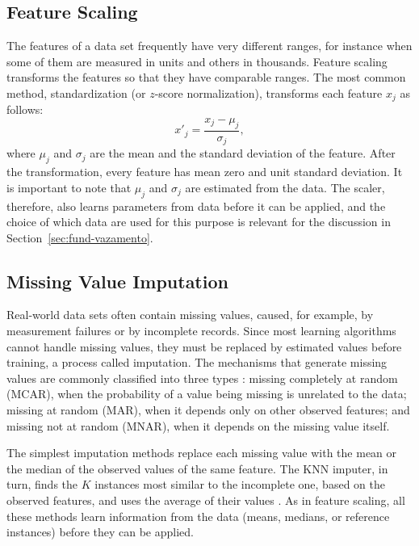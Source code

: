 \subsection{Feature Scaling}

The features of a data set frequently have very different ranges, for instance
when some of them are measured in units and others in thousands. Feature scaling
transforms the features so that they have comparable ranges. The most common
method, standardization (or $z$-score normalization), transforms each feature
$x_j$ as follows:
\begin{equation}
  x'_j = \frac{x_j - \mu_j}{\sigma_j},
  \label{eq:zscore}
\end{equation}
where $\mu_j$ and $\sigma_j$ are the mean and the standard deviation of the
feature. After the transformation, every feature has mean zero and unit standard
deviation. It is important to note that $\mu_j$ and $\sigma_j$ are estimated from
the data. The scaler, therefore, also learns parameters from data before it can
be applied, and the choice of which data are used for this purpose is relevant
for the discussion in Section~\ref{sec:fund-vazamento}.

\subsection{Missing Value Imputation}

Real-world data sets often contain missing values, caused, for example, by
measurement failures or by incomplete records. Since most learning algorithms
cannot handle missing values, they must be replaced by estimated values before
training, a process called imputation. The mechanisms that generate missing
values are commonly classified into three types \cite{rubin1976,little2019}:
missing completely at random (MCAR), when the probability of a value being
missing is unrelated to the data; missing at random (MAR), when it depends only
on other observed features; and missing not at random (MNAR), when it depends on
the missing value itself.

The simplest imputation methods replace each missing value with the mean or the
median of the observed values of the same feature. The KNN imputer, in turn,
finds the $K$ instances most similar to the incomplete one, based on the
observed features, and uses the average of their values \cite{troyanskaya2001}.
As in feature scaling, all these methods learn information from the data (means,
medians, or reference instances) before they can be applied.


